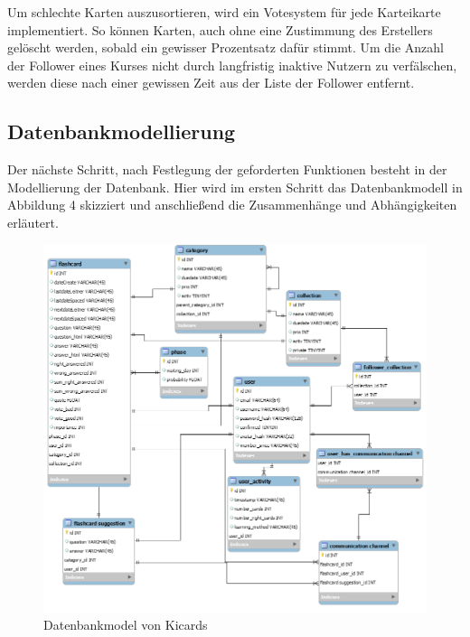 Um schlechte Karten auszusortieren, wird ein Votesystem für jede Karteikarte implementiert. So können Karten, auch ohne eine Zustimmung des Erstellers gelöscht werden, sobald ein gewisser Prozentsatz dafür stimmt. Um die Anzahl der Follower eines Kurses nicht durch langfristig inaktive Nutzern zu verfälschen, werden diese nach einer gewissen Zeit aus der Liste der Follower entfernt. 

\subsection{Datenbankmodellierung}
Der nächste Schritt, nach Festlegung der geforderten Funktionen besteht in der Modellierung der Datenbank. Hier wird im ersten Schritt das Datenbankmodell in Abbildung 4 skizziert und anschließend die Zusammenhänge und Abhängigkeiten erläutert.  \\

\begin{figure}[h]
 \includegraphics[width = 15cm]{databasemodel.png}
 \caption{Datenbankmodel von Kicards}
 \label{fig:datenbankmodel}
\end{figure}


